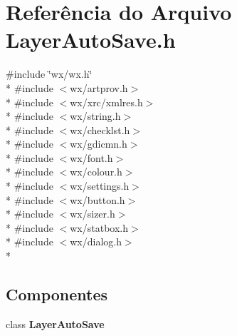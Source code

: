 \section{Referência do Arquivo Layer\+Auto\+Save.\+h}
\label{_layer_auto_save_8h}
{\ttfamily \#include \char`\"{}wx/wx.\+h\char`\"{}}\\*
{\ttfamily \#include $<$wx/artprov.\+h$>$}\\*
{\ttfamily \#include $<$wx/xrc/xmlres.\+h$>$}\\*
{\ttfamily \#include $<$wx/string.\+h$>$}\\*
{\ttfamily \#include $<$wx/checklst.\+h$>$}\\*
{\ttfamily \#include $<$wx/gdicmn.\+h$>$}\\*
{\ttfamily \#include $<$wx/font.\+h$>$}\\*
{\ttfamily \#include $<$wx/colour.\+h$>$}\\*
{\ttfamily \#include $<$wx/settings.\+h$>$}\\*
{\ttfamily \#include $<$wx/button.\+h$>$}\\*
{\ttfamily \#include $<$wx/sizer.\+h$>$}\\*
{\ttfamily \#include $<$wx/statbox.\+h$>$}\\*
{\ttfamily \#include $<$wx/dialog.\+h$>$}\\*
\subsection*{Componentes}
\begin{DoxyCompactItemize}
\item 
class {\bf Layer\+Auto\+Save}
\end{DoxyCompactItemize}
